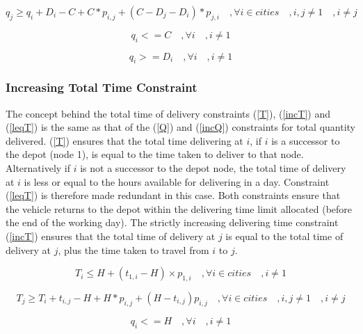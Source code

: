 \documentclass[a4paper,11pt]{article}
\begin{document}
\begin{equation}\label{incQ}
q_{j} \geq q_{i} + D_{i} - C + C*p_{i,j}  + (C-D_{j}-D_{i})*p_{j,i}\quad, \forall i \in cities\quad, i,j \neq 1 \quad, i\neq j
\end{equation}

\begin{equation}\label{Qleq}
q_{i} <= C \quad, \forall i\quad, i\neq1
\end{equation}

\begin{equation}\label{Qgeq}
q_{i} >= D_{i} \quad, \forall i\quad, i\neq1
\end{equation}


\subsubsection{Increasing Total Time Constraint}

The concept behind the total time of delivery constraints (\ref{T}), (\ref{incT}) and (\ref{leqT})  is the same as that of the (\ref{Q}) and (\ref{incQ}) constraints for total quantity delivered. (\ref{T}) ensures that the total time delivering at $i$, if $i$ is a successor to the depot (node 1), is equal to the time taken to deliver to that node. Alternatively if $i$ is not a successor to the depot node, the total time of delivery at $i$ is less or equal to the hours available for delivering in a day. Constraint (\ref{leqT}) is therefore made redundant in this case. Both constraints ensure that the vehicle returns to the depot within the delivering time limit allocated (before the end of the working day). The strictly increasing delivering time constraint (\ref{incT}) ensures that the total time of delivery at $j$ is equal to the total time of delivery at $j$, plus the time taken to travel from $i$ to $j$.

\begin{equation}\label{T}
T_{i} \leq H + (t_{1,i} - H) \times  p _{1,i} \quad, \forall i \in cities \quad, i\neq1
\end{equation}

\begin{equation}\label{incT}
T_{j} \geq T_{i} + t_{i,j} - H + H*p_{i,j}  + (H -  t_{i,j})p_{i,j} \quad, \forall i \in cities\quad, i,j \neq 1 \quad, i\neq j
\end{equation}

\begin{equation}\label{leqT}
q_{i} <= H \quad, \forall i\quad, i\neq1
\end{equation}
\end{document}
